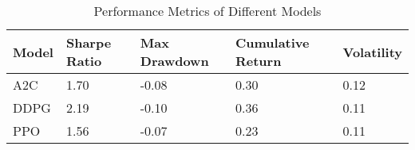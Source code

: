 \begin{table}[H]
\centering
\begin{tabular}{|l|l|l|l|l|}
\hline
Model & Sharpe Ratio & Max Drawdown & Cumulative Return & Volatility \\ \hline
A2C & 1.70 & -0.08 & 0.30 & 0.12 \\ \hline
DDPG & 2.19 & -0.10 & 0.36 & 0.11 \\ \hline
PPO & 1.56 & -0.07 & 0.23 & 0.11 \\ \hline
\end{tabular}
\caption{Performance Metrics of Different Models}
\label{tab:metrics}
\end{table}